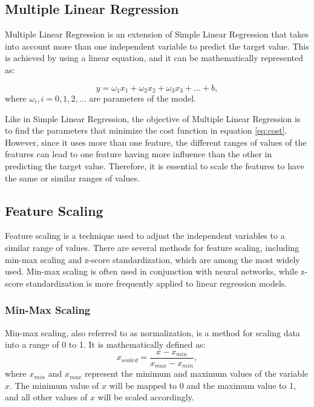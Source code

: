 \newpage
\subsection{Multiple Linear Regression}
Multiple Linear Regression is an extension of Simple Linear Regression that takes into account more than one independent variable to predict the target value. This is achieved by using a linear equation, and it can be mathematically represented as:

\begin{equation}\label{eq:lrmodel}
  y = \omega_1 x_1 + \omega_2 x_2 + \omega_3 x_3 + ... + b,
\end{equation} where $\omega_i, i =0, 1, 2, ...$ are parameters of the model.

Like in Simple Linear Regression, the objective of Multiple Linear Regression is to find the parameters that minimize the cost function in equation \ref{eq:cost}. However, since it uses more than one feature, the different ranges of values of the features can lead to one feature having more influence than the other in predicting the target value. Therefore, it is essential to scale the features to have the same or similar ranges of values.

\newpage
\subsection{Feature Scaling}
Feature scaling is a technique used to adjust the independent variables to a similar range of values. There are several methods for feature scaling, including min-max scaling and z-score standardization, which are among the most widely used. Min-max scaling is often used in conjunction with neural networks, while z-score standardization is more frequently applied to linear regression models.

\subsubsection{\textbf{Min-Max Scaling}}
Min-max scaling, also referred to as normalization, is a method for scaling data into a range of 0 to 1. It is mathematically defined as:
\begin{equation}\label{eq:normalization}
   x_{scaled} = \frac{x-x_{min}}{x_{max}-x_{min}},
\end{equation}where $x_{min}$ and $x_{max}$ represent the minimum and maximum values of the variable $x$. The minimum value of $x$ will be mapped to 0 and the maximum value to 1, and all other values of $x$ will be scaled accordingly.

